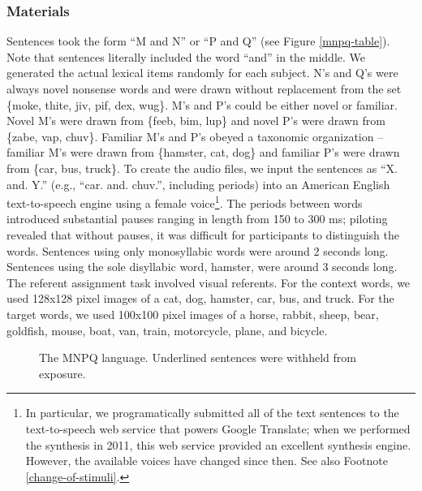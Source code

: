 \documentclass[man,floatsintext]{apa6}
\begin{document}
\subsubsection{Materials}
Sentences took the form ``M and N'' or ``P and Q'' (see Figure \ref{mnpq-table}). Note that sentences literally included the word ``and'' in the middle. We generated the actual lexical items randomly for each subject. N's and Q's were always novel nonsense words and were drawn without replacement from the set \{moke, thite, jiv, pif, dex, wug\}. M's and P's could be either novel or familiar. Novel M's were drawn from \{feeb, bim, lup\} and novel P's were drawn from \{zabe, vap, chuv\}. Familiar M's and P's obeyed a taxonomic organization -- familiar M's were drawn from \{hamster, cat, dog\} and familiar P's were drawn from \{car, bus, truck\}. To create the audio files, we input the sentences as ``X. and. Y.'' (e.g., ``car. and. chuv.'', including periods) into an American English text-to-speech engine using a female voice\footnote{\label{tts}In particular, we programatically submitted all of the text sentences to the text-to-speech web service that powers Google Translate; when we performed the synthesis in 2011, this web service provided an excellent synthesis engine. However, the available voices have changed since then. See also Footnote \ref{change-of-stimuli}.}. The periods between words introduced substantial pauses ranging in length from 150 to 300 ms; piloting revealed that without pauses, it was difficult for participants to distinguish the words. Sentences using only monosyllabic words were around 2 seconds long. Sentences using the sole disyllabic word, hamster, were around 3 seconds long.
The referent assignment task involved visual referents. For the context words, we used 128x128 pixel images of a cat, dog, hamster, car, bus, and truck. For the target words, we used 100x100 pixel images of a horse, rabbit, sheep, bear, goldfish, mouse, boat, van, train, motorcycle, plane, and bicycle.

\begin{figure}[t]
  \begin{center}
  \caption{The MNPQ language. Underlined sentences were withheld from exposure.}
  \vskip 0.12in
  \end{center}
  \vspace{-2ex}
\end{figure}
\end{document}
